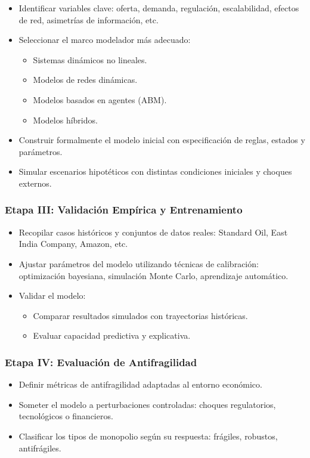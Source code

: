 \documentclass[a4paper,12pt]{article}
\begin{document}
\begin{itemize}
    \item Identificar variables clave: oferta, demanda, regulación, escalabilidad, efectos de red, asimetrías de información, etc.
    \item Seleccionar el marco modelador más adecuado:
    \begin{itemize}
        \item Sistemas dinámicos no lineales.
        \item Modelos de redes dinámicas.
        \item Modelos basados en agentes (ABM).
        \item Modelos híbridos.
    \end{itemize}
    \item Construir formalmente el modelo inicial con especificación de reglas, estados y parámetros.
    \item Simular escenarios hipotéticos con distintas condiciones iniciales y choques externos.
\end{itemize}

\subsubsection*{Etapa III: Validación Empírica y Entrenamiento}

\begin{itemize}
    \item Recopilar casos históricos y conjuntos de datos reales: Standard Oil, East India Company, Amazon, etc.
    \item Ajustar parámetros del modelo utilizando técnicas de calibración: optimización bayesiana, simulación Monte Carlo, aprendizaje automático.
    \item Validar el modelo:
    \begin{itemize}
        \item Comparar resultados simulados con trayectorias históricas.
        \item Evaluar capacidad predictiva y explicativa.
    \end{itemize}
\end{itemize}

\subsubsection*{Etapa IV: Evaluación de Antifragilidad}

\begin{itemize}
    \item Definir métricas de antifragilidad adaptadas al entorno económico.
    \item Someter el modelo a perturbaciones controladas: choques regulatorios, tecnológicos o financieros.
    \item Clasificar los tipos de monopolio según su respuesta: frágiles, robustos, antifrágiles.
\end{itemize}
\end{document}
